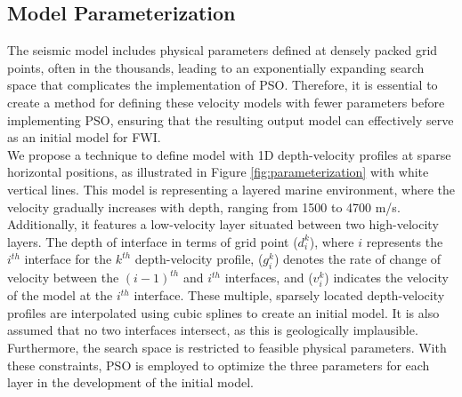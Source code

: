\documentclass[paper,revised]{geophysics}
\begin{document}
\subsection{Model Parameterization}
The seismic model includes physical parameters defined at densely packed grid points, often in the thousands, leading to an exponentially expanding search space that complicates the implementation of PSO. Therefore, it is essential to create a method for defining these velocity models with fewer parameters before implementing PSO, ensuring that the resulting output model can effectively serve as an initial model for FWI. 
\\
We propose a technique to define model with 1D depth-velocity profiles at sparse horizontal positions, as illustrated in Figure \ref{fig:parameterization} with white vertical lines. This model is representing a layered marine environment, where the velocity gradually increases with depth, ranging from 1500 to 4700 m/s. Additionally, it features a low-velocity layer situated between two high-velocity layers. The depth of interface in terms of grid point (\(d_i^k\)), where \(i\) represents the \(i^{th}\) interface for the \(k^{th}\) depth-velocity profile, (\(g_i^k\)) denotes the rate of change of velocity between the \((i - 1)^{th}\) and \(i^{th}\) interfaces, and (\(v_i^k\)) indicates the velocity of the model at the \(i^{th}\) interface.  These multiple, sparsely located depth-velocity profiles are interpolated using cubic splines to create an initial model. It is also assumed that no two interfaces intersect, as this is geologically implausible. Furthermore, the search space is restricted to feasible physical parameters. With these constraints, PSO is employed to optimize the three parameters for each layer in the development of the initial model.

\end{document}
